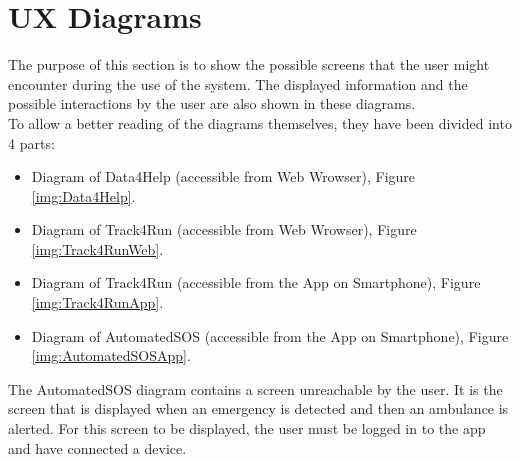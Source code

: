 \section{UX Diagrams}
The purpose of this section is to show the possible screens that the user might encounter during the use of the system.
The displayed information and the possible interactions by the user are also shown in these diagrams.\\
To allow a better reading of the diagrams themselves, they have been divided into 4 parts:
\begin{itemize}
  \item Diagram of Data4Help (accessible from Web Wrowser), Figure \ref{img:Data4Help}.
  \item Diagram of Track4Run (accessible from Web Wrowser), Figure \ref{img:Track4RunWeb}.
  \item Diagram of Track4Run (accessible from the App on Smartphone), Figure \ref{img:Track4RunApp}.
  \item Diagram of AutomatedSOS (accessible from the App on Smartphone), Figure \ref{img:AutomatedSOSApp}.
\end{itemize}
The AutomatedSOS diagram contains a screen unreachable by the user. It is the screen that is displayed when an emergency is detected and then an ambulance is alerted. For this screen to be displayed, the user must be logged in to the app and have connected a device.

